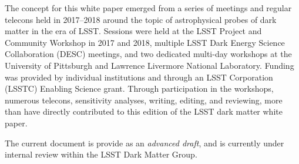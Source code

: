 The concept for this white paper emerged from a series of meetings and regular telecons held in 2017--2018 around the topic of astrophysical probes of dark matter in the era of LSST.
Sessions were held at the LSST Project and Community Workshop in 2017 and 2018, multiple LSST Dark Energy Science Collaboration (DESC) meetings, and two dedicated multi-day workshops at the University of Pittsburgh and Lawrence Livermore National Laboratory.
Funding was provided by individual institutions and through an LSST Corporation (LSSTC) Enabling Science grant.
Through participation in the workshops, numerous telecons, sensitivity analyses, writing, editing, and reviewing, more than  have directly contributed to this edition of the LSST dark matter white paper.

The current document is provide as an \emph{advanced draft}, and is currently under internal review within the LSST Dark Matter Group.




